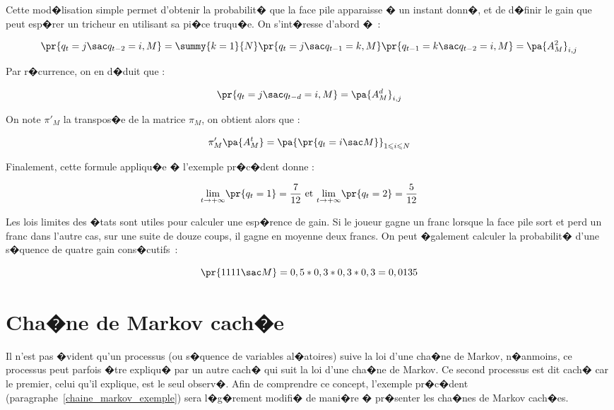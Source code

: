 
Cette mod�lisation simple permet d'obtenir la probabilit� que la face pile apparaisse � un instant donn�, et de d�finir le gain que peut esp�rer un tricheur en utilisant sa pi�ce truqu�e. On s'int�resse d'abord �~:

        $$
        \pr{  q_{t}=j \sac  q_{t-2}=i,M  }  = \summy{k=1}{N} \pr{ q_{t}=j \sac  q_{t-1}=k,M }
        \pr{  q_{t-1}=k \sac  q_{t-2}=i,M }   = \pa {  A_{M} ^{2} }  _{i,j}
        $$

Par r�currence, on en d�duit que :

        $$
        \pr{  q_{t}=j \sac q_{t-d}=i,M } = \pa {  A_{M}^{d} }  _{i,j}
        $$

On note $\pi'_M$ la transpos�e de la matrice $\pi_M$, on obtient alors que :

        $$
        \pi'_M \pa {  A_{M}^{t} } = \pa {  \pr {   q_{t}=i \sac   M } } _{1\leqslant i\leqslant N}
        $$

Finalement, cette formule appliqu�e � l'exemple pr�c�dent donne :

        $$
        \underset{t\rightarrow+\infty}{\lim}    \pr{   q_{t}=1 }  =\frac{7}{12} \text{ et }
        \underset{t\rightarrow+\infty}{\lim}    \pr{   q_{t}=2 }  =\frac{5}{12}%
        $$

Les lois limites des �tats sont utiles pour calculer une esp�rence de gain. Si le joueur gagne un franc lorsque la face pile sort et perd un franc dans l'autre cas, sur une suite de douze coups, il gagne en moyenne deux francs. On peut �galement calculer la probabilit� d'une s�quence de quatre gain cons�cutifs~:

        $$
        \pr {  1111 \sac M }  =0,5\ast0,3\ast0,3\ast0,3=0,0135
        $$












\section{Cha�ne de Markov cach�e}
\label{interdoc_mmc}

Il n'est pas �vident qu'un processus (ou s�quence de variables al�atoires) suive la loi d'une cha�ne de Markov, n�anmoins, ce processus peut parfois �tre expliqu� par un autre cach� qui suit la loi d'une cha�ne de Markov. Ce second processus est dit cach� car le premier, celui qu'il explique, est le seul observ�. Afin de comprendre ce concept, l'exemple pr�c�dent (paragraphe~\ref{chaine_markov_exemple}) sera l�g�rement modifi� de mani�re � pr�senter les cha�nes de Markov cach�es.

